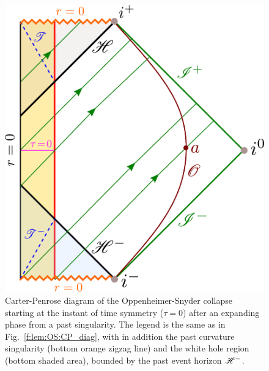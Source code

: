 \begin{figure}
\centerline{\includegraphics[height=0.35\textheight]{lem_OS_CP_diag_sym.pdf}}
\caption[]{\label{f:lem:OS:CP_diag_sym} \footnotesize
Carter-Penrose diagram of the Oppenheimer-Snyder collapse starting at
the instant of time symmetry ($\tau=0$) after an expanding phase from
a past singularity. The legend is the same as in Fig.~\ref{f:lem:OS:CP_diag},
with in addition the past curvature singularity (bottom orange zigzag line)
and the white hole region (bottom shaded area), bounded by the past event
horizon $\mathscr{H}^-$.
}
\end{figure}

